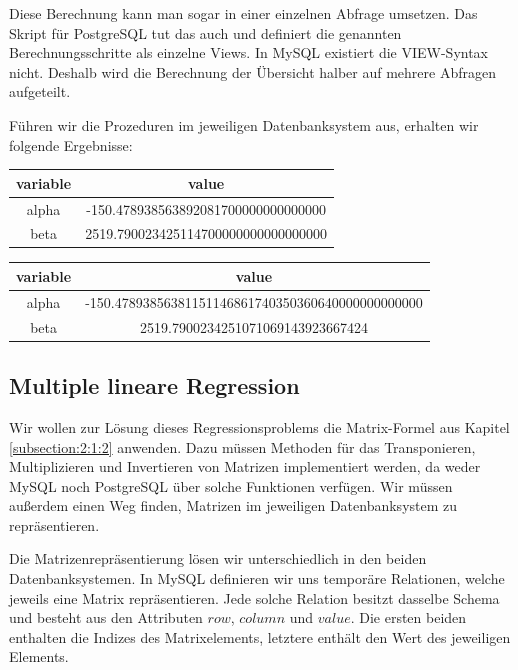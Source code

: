Diese Berechnung kann man sogar in einer einzelnen Abfrage umsetzen. Das Skript für PostgreSQL tut das auch und definiert die genannten Berechnungsschritte als einzelne Views. In MySQL existiert die VIEW-Syntax nicht. Deshalb wird die Berechnung der Übersicht halber auf mehrere Abfragen aufgeteilt.

Führen wir die Prozeduren im jeweiligen Datenbanksystem aus, erhalten wir folgende Ergebnisse:

\begin{center}
  \begin{tabular}{|c|c|}\hline
    \textbf{variable} & \textbf{value} \\ \hline
    alpha & -150.478938563892081700000000000000 \\ \hline
    beta & 2519.790023425114700000000000000000 \\ \hline
  \end{tabular}

  \begin{tabular}{|c|c|}\hline
    \textbf{variable} & \textbf{value} \\ \hline
    alpha & -150.47893856381151146861740350360640000000000000 \\ \hline
    beta & 2519.7900234251071069143923667424 \\ \hline
  \end{tabular}
\end{center}

\subsection{Multiple lineare Regression}
\label{subsection:3:4:2}

Wir wollen zur Lösung dieses Regressionsproblems die Matrix-Formel aus Kapitel \ref{subsection:2:1:2} anwenden. Dazu müssen Methoden für das Transponieren, Multiplizieren und Invertieren von Matrizen implementiert werden, da weder MySQL noch PostgreSQL über solche Funktionen verfügen. Wir müssen außerdem einen Weg finden, Matrizen im jeweiligen Datenbanksystem zu repräsentieren.

Die Matrizenrepräsentierung lösen wir unterschiedlich in den beiden Datenbanksystemen. In MySQL definieren wir uns temporäre Relationen, welche jeweils eine Matrix repräsentieren. Jede solche Relation besitzt dasselbe Schema und besteht aus den Attributen $row$, $column$ und $value$. Die ersten beiden enthalten die Indizes des Matrixelements, letztere enthält den Wert des jeweiligen Elements.

